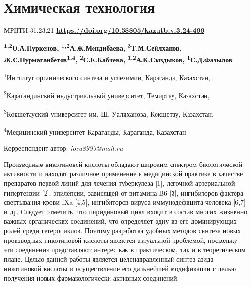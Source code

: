\let\cleardoublepage\clearpage
\chapter{Химическая технология}
МРНТИ 31.23.21
\hfill {\bfseries \href{https://doi.org/10.58805/kazutb.v.3.24-499}{https://doi.org/10.58805/kazutb.v.3.24-499}}


\begin{center}
{\bfseries \textsuperscript{1,2}О.А.Нуркенов, \textsuperscript{1,2}А.Ж.Мендибаева, \textsuperscript{3}Т.М.Сейлханов, Ж.С.Нурмаганбетов\textsuperscript{1,4}, \textsuperscript{2}С.К.Кабиева, \textsuperscript{1,2}А.К.Сыздыков, \textsuperscript{1}С.Д.Фазылов\envelope}

\textsuperscript{1}Институт органического синтеза и углехимии,
Караганда, Казахстан,

\textsuperscript{2}Карагандинский индустриальный университет, Темиртау,
Казахстан,

\textsuperscript{3}Кокшетауский университет им. Ш. Уалиханова, Кокшетау,
Казахстан,

\textsuperscript{4}Медицинский университет Караганды, Караганда,
Казахстан
\end{center}
\envelope Корреспондент-автор: \emph{iosu8990@mail.ru}\vspace{0.5cm}

Производные никотиновой кислоты обладают широким спектром биологической
активности и находят различное применение в медицинской практике в
качестве препаратов первой линий для лечения туберкулеза {[}1{]},
легочной артериальной гипертензии {[}2{]}, эпилепсии, зависящей от
витамина B6 {[}3{]}, ингибиторов фактора свертывания крови IXa
{[}4,5{]}, ингибиторов вируса иммунодефицита человека {[}6,7{]} и др.
Следует отметить, что пиридиновый цикл входит в состав многих жизненно
важных органических соединений, что определяет одну из его доминирующих
ролей среди гетероциклов. Поэтому разработка удобных методов синтеза
новых производных никотиновой кислоты является актуальной проблемой,
поскольку эти соединения представляют интерес как в практическом, так и
в теоретическом плане. Целью данной работы является целенаправленный
синтез азида никотиновой кислоты и осуществление его дальнейшей
модификации с целью получения новых фармакологически активных
соединений.

